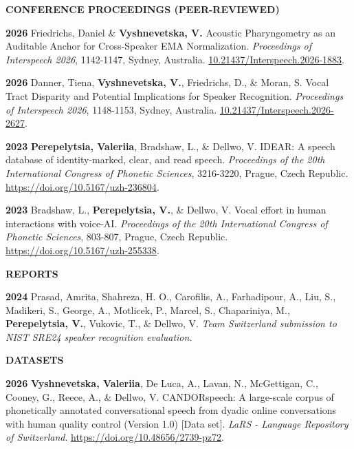 \documentclass[11pt]{article}
\newcommand{\hangpara}{
 \setlength{\parindent}{0in} %
 \hangindent=0.42in %
}
\begin{document}
\vskip 18pt
\begin{flushleft}
{\bf CONFERENCE PROCEEDINGS (PEER-REVIEWED)}
\end{flushleft}
\vskip 6pt
\hangpara
{\bf 2026}\hspace{1ex} Friedrichs, Daniel \& \textbf{Vyshnevetska, V.} Acoustic Pharyngometry as an Auditable Anchor for Cross-Speaker EMA Normalization. \textit{Proceedings of Interspeech 2026}, 1142-1147, Sydney, Australia. \url{10.21437/Interspeech.2026-1883}.
\vskip 6pt
\hangpara
{\bf 2026}\hspace{1ex} Danner, Tiena, \textbf{Vyshnevetska, V.}, Friedrichs, D., \& Moran, S. Vocal Tract Disparity and Potential Implications for Speaker Recognition. \textit{Proceedings of Interspeech 2026}, 1148-1153, Sydney, Australia. \url{10.21437/Interspeech.2026-2627}.
\vskip 6pt
\hangpara
{\bf 2023}\hspace{1ex} \textbf{Perepelytsia, Valeriia}, Bradshaw, L., \& Dellwo, V. IDEAR: A speech database of identity-marked, clear, and read speech. \textit{Proceedings of the 20th International Congress of Phonetic Sciences}, 3216-3220, Prague, Czech Republic. \url{https://doi.org/10.5167/uzh-236804}.
\vskip 6pt
\hangpara
{\bf 2023}\hspace{1ex} Bradshaw, L., \textbf{Perepelytsia, V.}, \& Dellwo, V. Vocal effort in human interactions with voice-AI. \textit{Proceedings of the 20th International Congress of Phonetic Sciences}, 803-807, Prague, Czech Republic. \url{https://doi.org/10.5167/uzh-255338}.



\vskip 18pt
\begin{flushleft}
{\bf REPORTS}
\end{flushleft}
\vskip 6pt
\hangpara
{\bf 2024}\hspace{1ex} Prasad, Amrita, Shahreza, H. O., Carofilis, A., Farhadipour, A., Liu, S., Madikeri, S., George, A., Motlicek, P., Marcel, S., Chapariniya, M., \textbf{Perepelytsia, V.}, Vukovic, T., \& Dellwo, V. \textit{Team Switzerland submission to NIST SRE24 speaker recognition evaluation.}


\vskip 18pt
\begin{flushleft}
{\bf DATASETS}
\end{flushleft}
\vskip 6pt
\hangpara
{\bf 2026}\hspace{1ex} \textbf{Vyshnevetska, Valeriia}, De Luca, A., Lavan, N., McGettigan, C., Cooney, G., Reece, A., \& Dellwo, V. CANDORspeech: A large-scale corpus of phonetically annotated conversational speech from dyadic online conversations with human quality control (Version 1.0) [Data set]. {\it LaRS - Language Repository of Switzerland}. \url{https://doi.org/10.48656/2739-pz72}.
\end{document}
